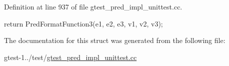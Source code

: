 \-Definition at line 937 of file gtest\-\_\-pred\-\_\-impl\-\_\-unittest.\-cc.


\begin{DoxyCode}
                                                          {
    return PredFormatFunction3(e1, e2, e3, v1, v2, v3);
  }
\end{DoxyCode}


\-The documentation for this struct was generated from the following file\-:\begin{DoxyCompactItemize}
\item 
gtest-\/1../test/\hyperlink{gtest__pred__impl__unittest_8cc}{gtest\-\_\-pred\-\_\-impl\-\_\-unittest.\-cc}\end{DoxyCompactItemize}
